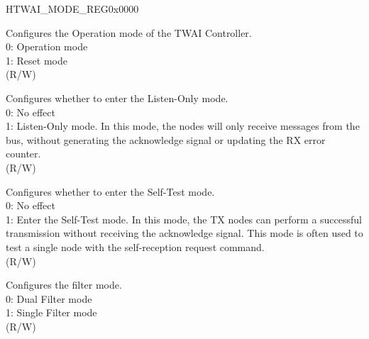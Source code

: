 \begin{register}{H}{TWAI\_MODE\_REG}{0x0000}\label{regdesc:TWAIMODEREG}
%
%
%
%
%
\regnewline%
\begin{regdesc}\begin{reglist}
\label{fielddesc:TWAIRESETMODE}\item [TWAI\_RESET\_MODE] Configures the Operation mode of the TWAI Controller. \\
0: Operation mode\\
1: Reset mode \\
(R/W)
\label{fielddesc:TWAILISTENONLYMODE}\item [TWAI\_LISTEN\_ONLY\_MODE] Configures whether to enter the Listen-Only mode. \\
0: No effect\\
1: Listen-Only mode. In this mode, the nodes will only receive messages from the bus, without generating the acknowledge signal or updating the RX error counter. \\
(R/W)
\label{fielddesc:TWAISELFTESTMODE}\item [TWAI\_SELF\_TEST\_MODE] Configures whether to enter the Self-Test mode. \\
0: No effect\\
1: Enter the Self-Test mode. In this mode, the TX nodes can perform a successful transmission without receiving the acknowledge signal. This mode is often used to test a single node with the self-reception request command. \\
(R/W)
\label{fielddesc:TWAIRXFILTERMODE}\item [TWAI\_RX\_FILTER\_MODE] Configures the filter mode.\\
0: Dual Filter mode\\
1: Single Filter mode \\
(R/W)
\end{reglist}\end{regdesc}
\end{register}


